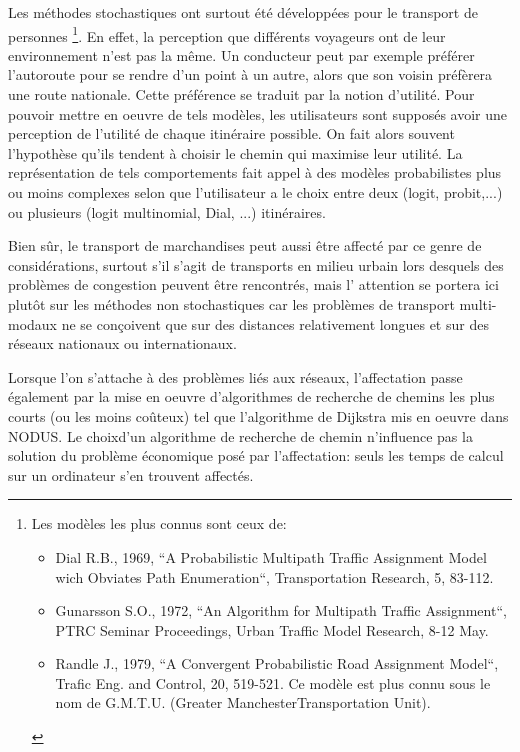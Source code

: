 Les méthodes stochastiques ont surtout été développées pour le
transport de personnes \footnote{Les modèles les plus connus sont
ceux de:
\begin{itemize}
\item Dial R.B., 1969, ``A Probabilistic Multipath Traffic Assignment
Model wich Obviates Path Enumeration``, Transportation Research, 5,
83-112.
\item Gunarsson S.O., 1972, ``An Algorithm for Multipath Traffic Assignment``,
PTRC Seminar Proceedings, Urban Traffic Model Research, 8-12 May.
\item Randle J., 1979, ``A Convergent Probabilistic Road Assignment
Model``, Trafic Eng. and Control, 20, 519-521. Ce modèle est plus
connu sous le nom de G.M.T.U. (Greater ManchesterTransportation
Unit).
\end{itemize}}. En effet, la perception que différents voyageurs ont de leur
environ\-ne\-ment n'est pas la même. Un conducteur peut par exemple préférer
l'autoroute pour se rendre d'un point à un autre, alors que son voisin préfèrera
une route nationale. Cette préférence se traduit par la notion d'utilité. Pour
pouvoir mettre en oeuvre de tels modèles, les utilisateurs sont supposés avoir
une perception de l'utilité de chaque itinéraire possible. On fait alors souvent
l'hypothèse qu'ils tendent à choisir le chemin qui maximise leur utilité. La
représentation de tels comportements fait appel à des modèles probabilistes plus
ou moins complexes selon que l'utilisateur a le choix entre deux (logit,
probit,...) ou plusieurs (logit multinomial, Dial, ...) itinéraires.


Bien sûr, le transport de marchandises peut aussi être affecté par ce genre de
considérations, surtout s'il s'agit de transports en milieu urbain lors desquels
des problèmes de congestion peuvent être rencontrés, mais l' attention se
portera ici plutôt sur les méthodes non stochastiques car les problèmes de
transport multi-modaux ne se conçoivent que sur des distances relativement
longues et sur des réseaux nationaux ou internationaux.


Lorsque l'on s'attache à des problèmes liés aux réseaux,
l'affectation passe également par la mise en oeuvre d'algorithmes
de recherche de chemins les plus courts (ou les moins coûteux) tel que l'algorithme 
de Dijkstra mis en oeuvre dans NODUS. Le choixd'un algorithme de recherche de 
chemin n'influence pas la solution du problème économique posé par 
l'affectation: seuls les temps de calcul sur un ordinateur s'en trouvent affectés.


